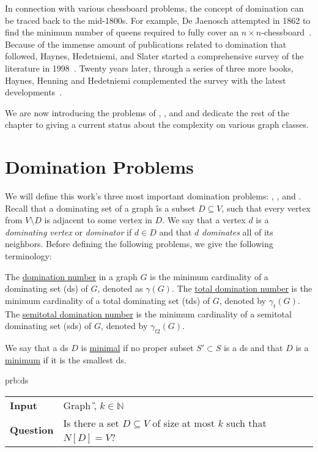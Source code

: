 In connection with various chessboard problems, the concept of domination can be traced back to the mid-1800s.
For example, De Jaenosch attempted in 1862 to find the minimum number of queens required to fully cover an $n \times n$-chessboard~\cite{Jaenisch1862}.
Because of the immense amount of publications related to domination that followed, Haynes, Hedetniemi, and Slater started a comprehensive survey of the literature in 1998~\cite{Haynes1998, Haynes1998b}. 
Twenty years later, through a series of three more books, Haynes, Henning and Hedetniemi complemented the survey with the latest developments~\cite{Haynes2020, Haynes2021, Haynes2022}.

We are now introducing the problems of \dom, \sdom, and \tdom and dedicate the rest of the chapter to giving a current status about the complexity on various graph classes. 

\section{Domination Problems}

We will define this work's three most important domination problems: \dom, \sdom, and \tdom.
Recall that a dominating set of a graph \G is a subset $D \subseteq V$, such that every vertex from $V \setminus D$ is adjacent to some vertex in $D$.
We say that a vertex $d$ is a \textit{dominating vertex} or \textit{dominator} if $d \in D$ and that $d$ \textit{dominates} all of its neighbors.
Before defining the following problems, we give the following terminology: 

\begin{definition}
   The \underline{domination number} in a graph $G$ is the minimum cardinality of a dominating set (ds) of $G$, denoted as $\gamma(G)$. 
   The \underline{total domination number} is the minimum cardinality of a total dominating set (tds) of $G$, denoted by $\gamma_t(G)$.
   The \underline{semitotal domination number} is the minimum cardinality of a semitotal dominating set (sds) of $G$, denoted by $\gamma_{t2}(G)$.

   We say that a ds $D$ is \underline{minimal} if no proper subset $S' \subset S$ is a ds and that $D$ is a \underline{minimum} if it is the smallest ds.
\end{definition}


\begin{prb}{prb:ds}
    \begin{tabularx}{1.0\textwidth}{>{\hsize=0.30\hsize}X>{\hsize=0.8\hsize}X}
        \textbf{Input} & Graph \G, $k \in \mathbb{N}$\\
        \textbf{Question} & Is there a set {$D \subseteq V$} of size at most $k$ such that ${N[D] = V}$? \\
    \end{tabularx}
\end{prb}


